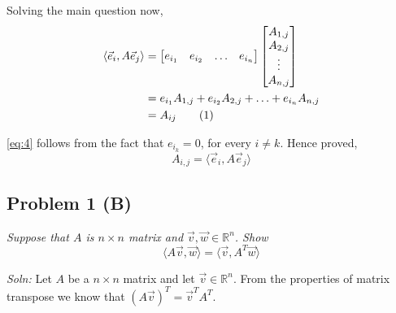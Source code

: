 \documentclass[12pt,a4paper]{article}
\newcommand\numberthis{\addtocounter{equation}{1}\tag{\theequation}}
\begin{document}
    Solving the main question now,
    \begin{align*}
        \langle \vec{e}_i, A\vec{e}_j \rangle &= 
        \begin{bmatrix}
            e_{i_1} & e_{i_2} & \hdots & e_{i_n}
        \end{bmatrix}
        \begin{bmatrix}
            A_{1,j} \\
            A_{2,j} \\
            \vdots \\
            A_{n,j} \\
        \end{bmatrix}
        \\
        &= e_{i_1}A_{1,j} + e_{i_2}A_{2,j} + \hdots + e_{i_n}A_{n,j} \\
        &= A_{ij} \numberthis \label{eq:4}
    \end{align*}
    
    \eqref{eq:4} follows from the fact that $e_{i_k}=0$, for every $i \neq k$. Hence proved, 
    $$A_{i,j} = \langle \vec{e}_i, A\vec{e}_j \rangle$$
    
    \subsection*{Problem 1 (B)}
    \textit{
        Suppose that $A$ is $n \times n$ matrix and $\vec{v},\vec{w} \in \mathbb{R}^n$. Show $$\langle A\vec{v}, \vec{w} \rangle = \langle \vec{v}, A^T\vec{w} \rangle$$
    }
    
    \noindent\textit{Soln: }Let $A$ be a $n \times n$ matrix and let $\vec{v} \in \mathbb{R}^n$. From the properties of matrix transpose we know that $(A\vec{v})^T = \vec{v}^{T}A^T$.
    
\end{document}
